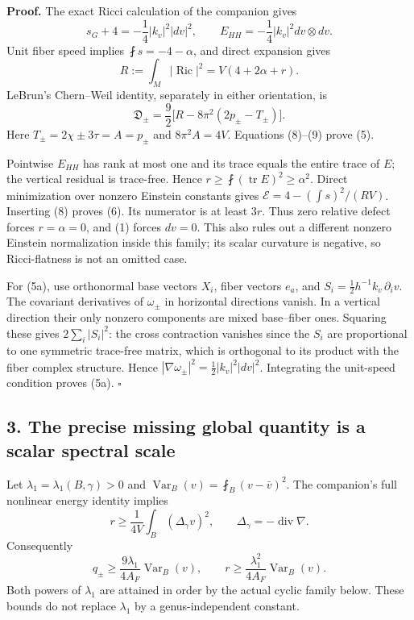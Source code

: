 \documentclass[
  11pt,
]{article}
\begin{document}
\textbf{Proof.} The exact Ricci calculation of the companion gives \[
 s_G+4=-\frac14|k_v|^2|dv|^2,\qquad
 E_{HH}=-\frac14|k_v|^2dv\otimes dv.                    \tag{7}
\] Unit fiber speed implies \(\fint s=-4-\alpha\), and direct expansion
gives \[
 R:=\int_M|\operatorname{Ric}|^2=V(4+2\alpha+r).
                                                               \tag{8}
\] LeBrun's Chern--Weil identity, separately in either orientation, is
\[
 \mathfrak D_\pm=\frac92\bigl[R-8\pi^2(2p_\pm-T_\pm)\bigr].
                                                               \tag{9}
\] Here \(T_\pm=2\chi\pm3\tau=A=p_\pm\) and \(8\pi^2A=4V\). Equations
(8)--(9) prove (5).

Pointwise \(E_{HH}\) has rank at most one and its trace equals the
entire trace of \(E\); the vertical residual is trace-free. Hence
\(r\ge\fint(\operatorname{tr}E)^2\ge\alpha^2\). Direct minimization over
nonzero Einstein constants gives \(\mathcal E=4-(\int s)^2/(RV)\).
Inserting (8) proves (6). Its numerator is at least \(3r\). Thus zero
relative defect forces \(r=\alpha=0\), and (1) forces \(dv=0\). This
also rules out a different nonzero Einstein normalization inside this
family; its scalar curvature is negative, so Ricci-flatness is not an
omitted case.

For (5a), use orthonormal base vectors \(X_i\), fiber vectors \(e_a\),
and \(S_i=\tfrac12h^{-1}k_v\,\partial_iv\). The covariant derivatives of
\(\omega_\pm\) in horizontal directions vanish. In a vertical direction
their only nonzero components are mixed base--fiber ones. Squaring these
gives \(2\sum_i|S_i|^2\): the cross contraction vanishes since the
\(S_i\) are proportional to one symmetric trace-free matrix, which is
orthogonal to its product with the fiber complex structure. Hence
\(|\nabla\omega_\pm|^2=\tfrac12|k_v|^2|dv|^2\). Integrating the
unit-speed condition proves (5a). \(\square\)

\hypertarget{the-precise-missing-global-quantity-is-a-scalar-spectral-scale}{%
\subsection{3. The precise missing global quantity is a scalar spectral
scale}\label{the-precise-missing-global-quantity-is-a-scalar-spectral-scale}}

Let \(\lambda_1=\lambda_1(B,\gamma)>0\) and
\(\operatorname{Var}_B(v)=\fint_B(v-\bar v)^2\). The companion's full
nonlinear energy identity implies \[
 r\ge\frac1{4V}\int_B(\Delta_\gamma v)^2,
 \qquad \Delta_\gamma=-\operatorname{div}\nabla.        \tag{10}
\] Consequently \[
 \boxed{q_\pm\ge\frac{9\lambda_1}{4A_F}
                       \operatorname{Var}_B(v),\qquad
 r\ge\frac{\lambda_1^2}{4A_F}\operatorname{Var}_B(v).} \tag{11}
\] Both powers of \(\lambda_1\) are attained in order by the actual
cyclic family below. These bounds do not replace \(\lambda_1\) by a
genus-independent constant.
\end{document}
